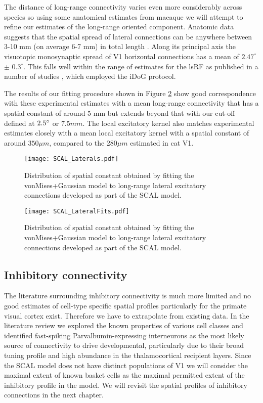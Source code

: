 The distance of long-range connectivity varies even more considerably
across species so using some anatomical estimates from macaque we will
attempt to refine our estimates of the long-range oriented
component. Anatomic data suggests that the spatial spread of lateral
connections can be anywhere between 3-10 mm (on average 6-7 mm) in
total length \cite{Angelucci2002}. Along its principal axis the
visuotopic monosynaptic spread of V1 horizontal connections has a mean
of \(2.47^\circ\) \(\pm\) \(0.3^\circ\). This falls well within the
range of estimates for the lsRF as published in a number of studies
\cite{Sceniak1999, Sceniak2001, Shushruth2009}, which employed the
iDoG protocol.

The results of our fitting procedure shown in Figure \ref{LatDist}
show good correspondence with these experimental estimates with a mean
long-range connectivity that has a spatial constant of around 5 mm but
extends beyond that with our cut-off defined at $2.5\degree$ or $7.5
mm$. The local excitatory kernel also matches experimental estimates
closely with a mean local excitatory kernel with a spatial constant of
around $350 \mu m$, compared to the $280 \mu m$ estimated in cat V1.

\begin{figure}
	\centering
        \texttt{[image: SCAL\_Laterals.pdf]}
	\caption{Distribution of spatial constant obtained by fitting
          the \cite{Buzas2006} vonMises+Gaussian model to long-range
          lateral excitatory connections developed as part of the SCAL
          model.}
	\label{LatFits}
\end{figure}

\begin{figure}
	\centering
        \texttt{[image: SCAL\_LateralFits.pdf]}
	\caption{Distribution of spatial constant obtained by fitting
          the \cite{Buzas2006} vonMises+Gaussian model to long-range
          lateral excitatory connections developed as part of the SCAL
          model.}
	\label{LatDist}
\end{figure}

\subsection{Inhibitory connectivity}

The literature surrounding inhibitory connectivity is much more
limited and no good estimates of cell-type specific spatial profiles
particularly for the primate visual cortex exist. Therefore we have to
extrapolate from existing data. In the literature review we explored
the known properties of various cell classes and identified
fast-spiking Parvalbumin-expressing interneurons as the most likely
source of connectivity to drive developmental, particularly due to
their broad tuning profile and high abundance in the thalamocortical
recipient layers. Since the SCAL model does not have distinct
populations of V1 we will consider the maximal extent of known basket
cells as the maximal permitted extent of the inhibitory profile in the
model. We will revisit the spatial profiles of inhibitory connections
in the next chapter.

